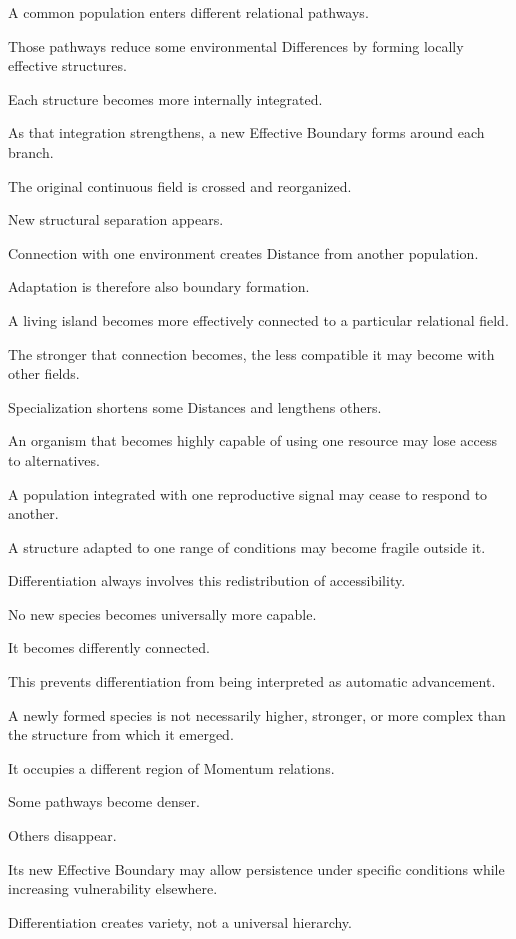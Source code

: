 A common population enters different relational pathways.

Those pathways reduce some environmental Differences by forming locally effective structures.

Each structure becomes more internally integrated.

As that integration strengthens, a new Effective Boundary forms around each branch.

The original continuous field is crossed and reorganized.

New structural separation appears.

Connection with one environment creates Distance from another population.

Adaptation is therefore also boundary formation.

A living island becomes more effectively connected to a particular relational field.

The stronger that connection becomes, the less compatible it may become with other fields.

Specialization shortens some Distances and lengthens others.

An organism that becomes highly capable of using one resource may lose access to alternatives.

A population integrated with one reproductive signal may cease to respond to another.

A structure adapted to one range of conditions may become fragile outside it.

Differentiation always involves this redistribution of accessibility.

No new species becomes universally more capable.

It becomes differently connected.

This prevents differentiation from being interpreted as automatic advancement.

A newly formed species is not necessarily higher, stronger, or more complex than the structure from which it emerged.

It occupies a different region of Momentum relations.

Some pathways become denser.

Others disappear.

Its new Effective Boundary may allow persistence under specific conditions while increasing vulnerability elsewhere.

Differentiation creates variety, not a universal hierarchy.

